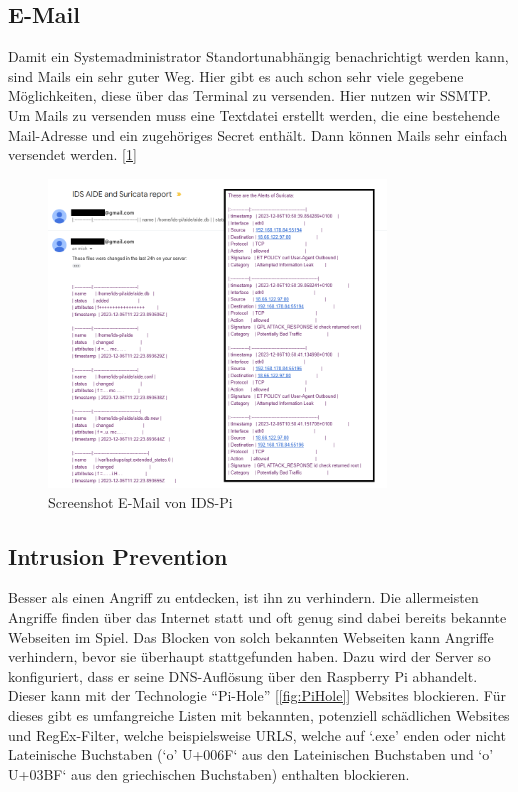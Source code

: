 \documentclass{article}
\begin{document}
\subsection{E-Mail}
Damit ein Systemadministrator Standortunabhängig benachrichtigt werden kann, sind Mails ein sehr guter Weg. Hier gibt es auch schon sehr viele gegebene Möglichkeiten, diese über das Terminal zu versenden. Hier nutzen wir SSMTP. Um Mails zu versenden muss eine Textdatei erstellt werden, die eine bestehende Mail-Adresse und ein zugehöriges Secret enthält. Dann können Mails sehr einfach versendet werden. [\ref{fig:mail}]
\begin{figure}[h]
    \centering
    \includegraphics[width=0.8\textwidth]{assets/mail.png}
    \caption{\label{fig:mail}Screenshot E-Mail von IDS-Pi}
\end{figure}

\vfil \break

\subsection{Intrusion Prevention}
Besser als einen Angriff zu entdecken, ist ihn zu verhindern. Die allermeisten Angriffe finden über das Internet statt und oft genug sind dabei bereits bekannte Webseiten im Spiel. Das Blocken von solch bekannten Webseiten kann Angriffe verhindern, bevor sie überhaupt stattgefunden haben. Dazu wird der Server so konfiguriert, dass er seine DNS-Auflösung über den Raspberry Pi abhandelt. Dieser kann mit der Technologie ``Pi-Hole'' [\ref{fig:PiHole}] Websites blockieren. Für dieses gibt es umfangreiche Listen mit bekannten, potenziell schädlichen Websites und RegEx-Filter, welche beispielsweise URLS, welche auf `.exe' enden oder nicht Lateinische Buchstaben (`o' U+006F` aus den Lateinischen Buchstaben und `o' U+03BF` aus den griechischen Buchstaben) enthalten blockieren.
\end{document}
